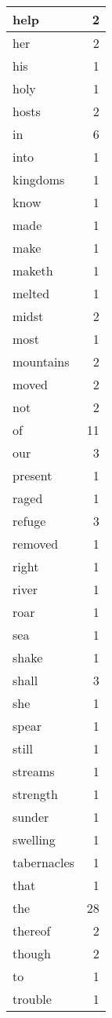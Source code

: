 \begin{center}
\begin{longtable}{l|r}
help & 2 \\ \hline
her & 2 \\ \hline
his & 1 \\ \hline
holy & 1 \\ \hline
hosts & 2 \\ \hline
in & 6 \\ \hline
into & 1 \\ \hline
kingdoms & 1 \\ \hline
know & 1 \\ \hline
made & 1 \\ \hline
make & 1 \\ \hline
maketh & 1 \\ \hline
melted & 1 \\ \hline
midst & 2 \\ \hline
most & 1 \\ \hline
mountains & 2 \\ \hline
moved & 2 \\ \hline
not & 2 \\ \hline
of & 11 \\ \hline
our & 3 \\ \hline
present & 1 \\ \hline
raged & 1 \\ \hline
refuge & 3 \\ \hline
removed & 1 \\ \hline
right & 1 \\ \hline
river & 1 \\ \hline
roar & 1 \\ \hline
sea & 1 \\ \hline
shake & 1 \\ \hline
shall & 3 \\ \hline
she & 1 \\ \hline
spear & 1 \\ \hline
still & 1 \\ \hline
streams & 1 \\ \hline
strength & 1 \\ \hline
sunder & 1 \\ \hline
swelling & 1 \\ \hline
tabernacles & 1 \\ \hline
that & 1 \\ \hline
the & 28 \\ \hline
thereof & 2 \\ \hline
though & 2 \\ \hline
to & 1 \\ \hline
trouble & 1 \\ \hline

\end{longtable}
\end{center}
